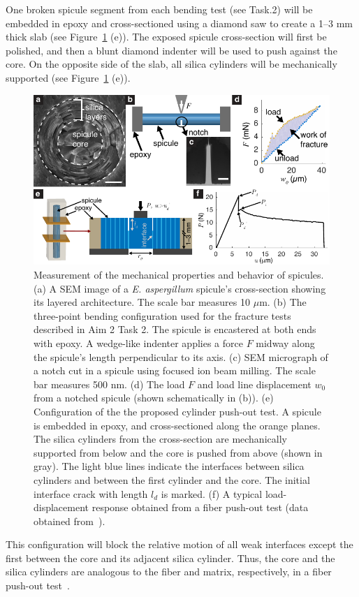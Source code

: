 \documentclass[10pt,letterpaper]{article}
\begin{document}
        One broken spicule segment from each bending test (see Task.2) will be embedded in epoxy and cross-sectioned using a diamond saw to create a 1--3 mm thick slab (see Figure~\ref{f:exp} (e)).
        The exposed spicule cross-section will first be polished, and then a blunt diamond indenter will be used to push against the core.
        On the opposite side of the slab, all silica cylinders will be mechanically supported (see Figure~\ref{f:exp} (e)).
        \begin{figure}[h!]
          \centering
            \includegraphics[width=\textwidth]{Figures/spicule/Layer_spicule_ver11.pdf}
            \caption{\footnotesize Measurement of the mechanical properties and behavior of spicules. (a) A SEM image of a \textit{E. aspergillum} spicule's cross-section showing its layered architecture. The scale bar measures 10 $\mu$m. (b) The three-point bending configuration used for the fracture tests described in Aim 2 Task 2. The spicule is encastered at both ends with epoxy. A wedge-like indenter applies a force $F$ midway along the spicule's length perpendicular to its axis. (c) SEM micrograph of a notch cut in a spicule using focused ion beam milling. The scale bar measures 500 nm. (d) The load $F$ and load line displacement $w_0$ from a notched spicule (shown schematically in (b)). (e) Configuration of the the proposed cylinder push-out test. A spicule is embedded in epoxy, and cross-sectioned along the orange planes. The silica cylinders from the cross-section are mechanically supported from below and the core is pushed from above (shown in gray). The light blue lines indicate the interfaces between silica cylinders and between the first cylinder and the core. The initial interface crack with length $l_d$ is marked. (f) A typical load-displacement response obtained from a fiber push-out test (data obtained from~\cite{bright1989interfacial}).}
            \label{f:exp}
        \end{figure}
        This configuration will block the relative motion of all weak interfaces except the first between the core and its adjacent silica cylinder.
        Thus, the core and the silica cylinders are analogous to the fiber and matrix, respectively, in a fiber push-out test~\cite{marshall1984indentation}.
\end{document}
